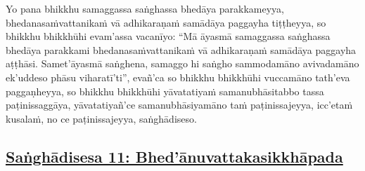 Yo pana bhikkhu samaggassa saṅghassa bhedāya parakkameyya, bhedanasaṁvattanikaṁ vā adhikaraṇaṁ samādāya paggayha tiṭṭheyya, so bhikkhu bhikkhūhi evam'assa vacanīyo:\makeatletter\hyperlink{endnote66-appendix}\makeatother{} ``Mā āyasmā\makeatletter\hyperlink{endnote67-appendix}\makeatother{} samaggassa saṅghassa bhedāya parakkami\makeatletter\hyperlink{endnote68-appendix}\makeatother{} bhedanasaṁvattanikaṁ vā adhikaraṇaṁ samādāya paggayha aṭṭhāsi. Samet'āyasmā saṅghena, samaggo hi saṅgho sammodamāno avivadamāno ek'uddeso phāsu viharatī'ti'', evañ'ca so bhikkhu bhikkhūhi vuccamāno tath'eva paggaṇheyya, so bhikkhu bhikkhūhi yāvatatiyaṁ samanubhāsitabbo tassa paṭinissaggāya, yāvatatiyañ'ce samanubhāsiyamāno taṁ paṭinissajeyya,\makeatletter\hyperlink{endnote69-appendix}\makeatother{} icc'etaṁ kusalaṁ, no ce paṭinissajeyya,\makeatletter\hyperlink{endnote70-appendix}\makeatother{} saṅghādiseso.



\subsection*{\hyperref[comm11]{Saṅghādisesa 11: Bhed'ānuvattakasikkhāpada}}
\label{sd11}

